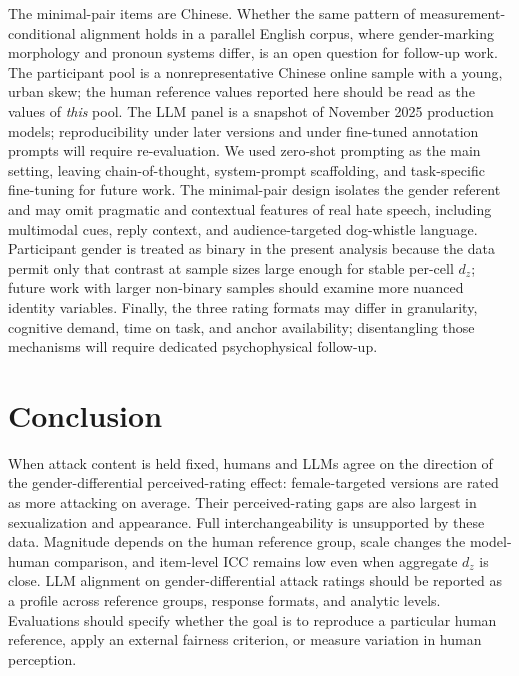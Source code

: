 \documentclass[a4paper,fleqn,review,longmktitle]{cas-sc}
\begin{document}
The minimal-pair items are Chinese. Whether the same pattern of measurement-conditional alignment holds in a parallel English corpus, where gender-marking morphology and pronoun systems differ, is an open question for follow-up work. The participant pool is a nonrepresentative Chinese online sample with a young, urban skew; the human reference values reported here should be read as the values of \emph{this} pool. The LLM panel is a snapshot of November 2025 production models; reproducibility under later versions and under fine-tuned annotation prompts will require re-evaluation. We used zero-shot prompting as the main setting, leaving chain-of-thought, system-prompt scaffolding, and task-specific fine-tuning for future work. The minimal-pair design isolates the gender referent and may omit pragmatic and contextual features of real hate speech, including multimodal cues, reply context, and audience-targeted dog-whistle language. Participant gender is treated as binary in the present analysis because the data permit only that contrast at sample sizes large enough for stable per-cell $d_z$; future work with larger non-binary samples should examine more nuanced identity variables. Finally, the three rating formats may differ in granularity, cognitive demand, time on task, and anchor availability; disentangling those mechanisms will require dedicated psychophysical follow-up.

\section{Conclusion}

When attack content is held fixed, humans and LLMs agree on the direction of the gender-differential perceived-rating effect: female-targeted versions are rated as more attacking on average. Their perceived-rating gaps are also largest in sexualization and appearance. Full interchangeability is unsupported by these data. Magnitude depends on the human reference group, scale changes the model-human comparison, and item-level ICC remains low even when aggregate $d_z$ is close. LLM alignment on gender-differential attack ratings should be reported as a profile across reference groups, response formats, and analytic levels. Evaluations should specify whether the goal is to reproduce a particular human reference, apply an external fairness criterion, or measure variation in human perception.

\appendix
\renewcommand{\thetable}{A\arabic{table}}
\setcounter{table}{0}
\end{document}
